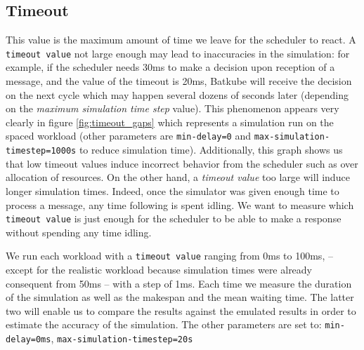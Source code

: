 \subsection{Timeout}

This value is the maximum amount of time we leave for the scheduler to react. A
\texttt{timeout value} not large enough may lead to inaccuracies in the
simulation: for example, if the scheduler needs 30ms to make a decision upon
reception of a message, and the value of the timeout is 20ms, Batkube will
receive the decision on the next cycle which may happen several dozens of
seconds later (depending on the \textit{maximum simulation time step} value).
This phenomenon appears very clearly in figure \ref{fig:timeout_gaps} which
represents a simulation run on the spaced workload (other parameters are
\texttt{min-delay=0} and \texttt{max-simulation-timestep=1000s} to reduce
simulation time). Additionally, this graph shows us that low timeout values
induce incorrect behavior from the scheduler such as over allocation of
resources.  On the other hand, a \textit{timeout value} too large will induce
longer simulation times. Indeed, once the simulator was given enough time to
process a message, any time following is spent idling. We want to measure which
\texttt{timeout value} is just enough for the scheduler to be able to make a
response without spending any time idling.

We run each workload with a \texttt{timeout value} ranging from 0ms to 100ms,
--except for the realistic workload because simulation times were already
consequent from 50ms -- with a step of 1ms. Each time we measure the duration
of the simulation as well as the makespan and the mean waiting time. The latter
two will enable us to compare the results against the emulated results in order
to estimate the accuracy of the simulation. The other parameters are set to:
\texttt{min-delay=0ms}, \texttt{max-simulation-timestep=20s}

